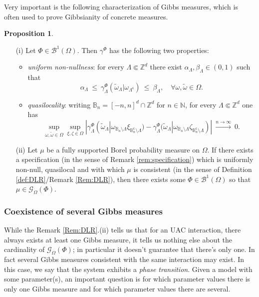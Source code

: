 \documentclass[12pt]{article}
\newcommand{\BB}{\mathscr{B}}
\newcommand{\BBB}{\mathbb{B}}
\newcommand{\G}{\mathcal{G}}
\newcommand{\N}{\mathbb{N}}
\newcommand{\Z}{\mathbb{Z}}
\newcommand{\ra}{\rightarrow}
\newcommand{\1}{\mathbbm{1}}
\renewcommand{\c}{\mathsf{c}}
\newcommand{\5}{\vspace{0.5cm}}
\renewcommand{\tilde}{\widetilde}
\theoremstyle{definition}
\newtheorem{prop}[thm]{Proposition}
\begin{document}
Very important is the following characterization of Gibbs measures, which is often used to prove Gibbsianity of concrete measures.
\begin{prop}\label{DLR:equiv}
~
\begin{itemize}
	\item[(i)] Let $\Phi\in\BB^1(\Omega)$. Then $\gamma^\Phi$ has the following two properties:
		\begin{itemize}
			\item \textit{uniform non-nullness}: for every $\Lambda\Subset\Z^d$ there exist $\alpha_\Lambda,\beta_\Lambda\in(0,1)$ such that
			$$\alpha_\Lambda ~\leq~ \gamma_\Lambda^\Phi(\tilde{\omega}_\Lambda|\omega_{\Lambda^\c}) ~\leq~ \beta_\Lambda, \quad\forall\omega,\tilde{\omega}\in\Omega.$$
			\item \textit{quasilocality}: writing $\BBB_n=[-n,n]^d\cap\Z^d$ for $n\in\N$, for every $\Lambda\Subset\Z^d$ one has
			$$\sup_{\omega,\tilde{\omega}\in\Omega}\sup_{\xi,\zeta\in\Omega}|\gamma_\Lambda^\Phi(\tilde{\omega}_\Lambda|\omega_{\BBB_n\setminus\Lambda}\xi_{\BBB_n^\c\setminus\Lambda})-\gamma_\Lambda^\Phi(\tilde{\omega}_\Lambda|\omega_{\BBB_n\setminus\Lambda}\zeta_{\BBB_n^\c\setminus\Lambda})| ~\xrightarrow{n\ra\infty}~ 0.$$
		\end{itemize}
		\item[(ii)] Let $\mu$ be a fully supported Borel probability measure on $\Omega$. If there exists a specification (in the sense of Remark \ref{rem:specification}) which is uniformly non-null, quasilocal and with which $\mu$ is consistent (in the sense of Definition \ref{def:DLR}/Remark \ref{Rem:DLR}), then there exists some $\Phi\in\BB^1(\Omega)$ so that $\mu\in\G_\Omega(\Phi)$.
		
\end{itemize}
\end{prop}


\subsubsection{Coexistence of several Gibbs measures}

While the Remark \ref{Rem:DLR}.(ii) tells us that for an UAC interaction, there always exists at least one Gibbs measure, it tells us nothing else about the cardinality of $\G_\Omega(\Phi)$; in particular it doesn't guarantee that there's only one. In fact several Gibbs measures consistent with the same interaction may exist. In this case, we say that the system exhibits a \textit{phase transition}. Given a model with some parameter(s), an important question is for which parameter values there is only one Gibbs measure and for which parameter values there are several. \\
\end{document}
